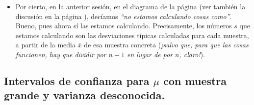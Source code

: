 \begin{itemize}
       \item Por cierto, en la anterior sesión, en el diagrama de la página \pageref{fig:DiagramaDistribucionMediaMuestral} (ver también la discusión en la página \pageref{eq:VarianzaDeMEdiasMuestrales}), decíamos {\em ``no estamos calculando cosas como''}. Bueno, pues ahora sí las estamos calculando. Precisamente, los números $s$ que estamos calculando son las desviaciones típicas calculadas para cada muestra, a partir de la media $\bar x$ de esa muestra concreta ({\em ¡salvo que, para que las cosas funcionen, hay que dividir por $n-1$ en lugar de por $n$, claro!}).
       \end{itemize}

       \subsection*{Intervalos de confianza para $\mu$ con muestra grande y varianza desconocida.}


